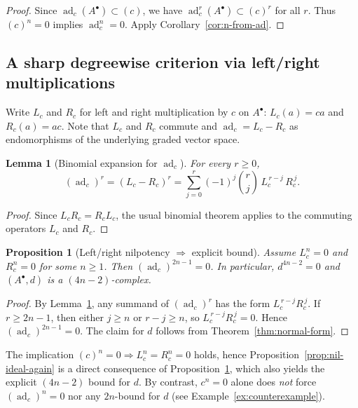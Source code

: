 \documentclass[preprint,12pt]{elsarticle}
\newcommand{\ad}{\operatorname{ad}}
\newtheorem{prop}{Proposition}
\newtheorem{lem}[thm]{Lemma}
\begin{document}
\begin{proof}
Since $\ad_c(A^\bullet)\subset (c)$, we have $\ad_c^r(A^\bullet)\subset (c)^r$ for all $r$.
Thus $(c)^n=0$ implies $\ad_c^n=0$. Apply Corollary~\ref{cor:n-from-ad}.
\end{proof}

\subsection{A sharp degreewise criterion via left/right multiplications}

Write $L_c$ and $R_c$ for left and right multiplication by $c$ on $A^\bullet$:
$L_c(a)=ca$ and $R_c(a)=ac$. Note that $L_c$ and $R_c$ commute and
$\ad_c=L_c-R_c$ as endomorphisms of the underlying graded vector space.

\begin{lem}[Binomial expansion for $\ad_c$]\label{lem:binomial-LR}
For every $r\ge 0$,
\[
(\ad_c)^r=(L_c-R_c)^r=\sum_{j=0}^{r}(-1)^j\binom{r}{j}\,L_c^{\,r-j}\,R_c^{\,j}.
\]
\end{lem}

\begin{proof}
Since $L_cR_c=R_cL_c$, the usual binomial theorem applies to the commuting operators $L_c$ and $R_c$.
\end{proof}

\begin{prop}[Left/right nilpotency $\Rightarrow$ explicit bound]\label{prop:LR-nilpotency}
Assume $L_c^n=0$ and $R_c^n=0$ for some $n\ge 1$. Then $(\ad_c)^{2n-1}=0$.
In particular, $d^{4n-2}=0$ and $(A^\bullet,d)$ is a $(4n-2)$-complex.
\end{prop}

\begin{proof}
By Lemma~\ref{lem:binomial-LR}, any summand of $(\ad_c)^r$ has the form $L_c^{\,r-j}R_c^{\,j}$.
If $r\ge 2n-1$, then either $j\ge n$ or $r-j\ge n$, so $L_c^{\,r-j}R_c^{\,j}=0$.
Hence $(\ad_c)^{2n-1}=0$. The claim for $d$ follows from Theorem~\ref{thm:normal-form}.
\end{proof}

\begin{rmk}\label{rem:hierarchy}
The implication $(c)^n=0\Rightarrow L_c^n=R_c^n=0$ holds, hence
Proposition~\ref{prop:nil-ideal-again} is a direct consequence of
Proposition~\ref{prop:LR-nilpotency}, which also yields the explicit $(4n-2)$ bound for $d$.
By contrast, $c^n=0$ alone does \emph{not} force $(\ad_c)^n=0$ nor any $2n$-bound for $d$
(see Example~\ref{ex:counterexample}).
\end{rmk}
\end{document}
